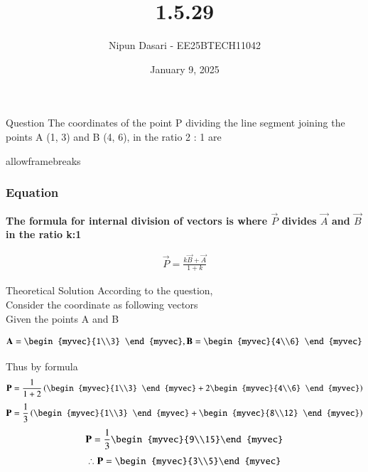 \documentclass{beamer}
\title %
{1.5.29}
\date{January 9, 2025}
\author %
{Nipun Dasari - EE25BTECH11042}
\begin{document}
	
	
	\frame{\titlepage}
	\begin{frame}{Question}
		The coordinates of the point P dividing the line segment joining the points A (1, 3)
		and B (4, 6), in the ratio 2 : 1 are
	\end{frame}
	\begin{frame}{allowframebreaks}
		\frametitle{Equation}
	\textbf{The formula for internal division of vectors is where $\vec{P}$ divides $\vec{A}$ and $\vec{B}$ in the ratio k:1}
		\centering
		
		\label{tab:parameters}
		\begin{align*}

		
			\vec{P} =	\frac{k\vec{B} + \vec{A}}{1+k} 
		
		\end{align*}
		
	\end{frame}
	
	
	\begin{frame}{Theoretical Solution}
	According to the question, \\
Consider the coordinate as following vectors \\ 

Given the points A and B

\begin{align*}
	\vec{A} = \begin{myvec}{1\\3} \end{myvec} , \vec{B} = \begin{myvec}{4\\6} \end{myvec}
\end{align*}

Thus by formula
\begin{align*}
	\vec{P} = \frac{1}{1+2}\brak{\begin{myvec}{1\\3} \end{myvec}+2\begin{myvec}{4\\6} \end{myvec}}
\end{align*}
\begin{align*}
	\vec{P} = \frac{1}{3}\brak{\begin{myvec}{1\\3} \end{myvec}+\begin{myvec}{8\\12} \end{myvec}}
\end{align*}
\begin{align*}
	\vec{P} = \frac{1}{3}\begin{myvec}{9\\15}\end{myvec}
\end{align*}
\begin{align*}
	\therefore	\vec{P} = \begin{myvec}{3\\5}\end{myvec}
\end{align*}
\end{frame}
	
\end{document}
